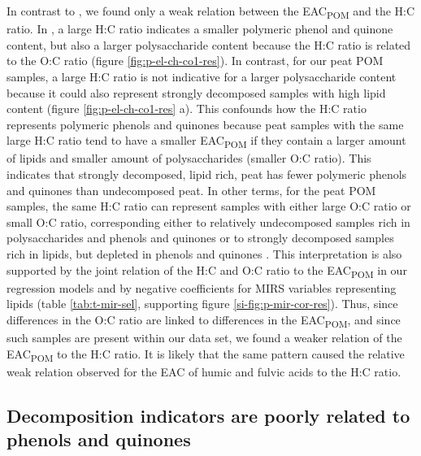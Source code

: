 \documentclass[draft,linenumbers]{agujournal2018}
\begin{document}
In contrast to \citet{Aeschbacher.2012}, we found only a weak relation
between the EAC\textsubscript{POM} and the H:C ratio. In
\citet{Aeschbacher.2012}, a large H:C ratio indicates a smaller
polymeric phenol and quinone content, but also a larger polysaccharide
content because the H:C ratio is related to the O:C ratio (figure
\ref{fig:p-el-ch-co1-res}). In contrast, for our peat POM samples, a
large H:C ratio is not indicative for a larger polysaccharide content
because it could also represent strongly decomposed samples with high
lipid content (figure \ref{fig:p-el-ch-co1-res} a). This confounds how
the H:C ratio represents polymeric phenols and quinones because peat
samples with the same large H:C ratio tend to have a smaller
EAC\textsubscript{POM} if they contain a larger amount of lipids and
smaller amount of polysaccharides (smaller O:C ratio). This indicates
that strongly decomposed, lipid rich, peat has fewer polymeric phenols
and quinones than undecomposed peat. In other terms, for the peat POM
samples, the same H:C ratio can represent samples with either large O:C
ratio or small O:C ratio, corresponding either to relatively
undecomposed samples rich in polysaccharides and phenols and quinones or
to strongly decomposed samples rich in lipids, but depleted in phenols
and quinones \citep{Kim.2003, Leifeld.2012, Bader.2018}. This
interpretation is also supported by the joint relation of the H:C and
O:C ratio to the EAC\textsubscript{POM} in our regression models and by
negative coefficients for MIRS variables representing lipids (table
\ref{tab:t-mir-sel}, supporting figure \ref{si-fig:p-mir-cor-res}).
Thus, since differences in the O:C ratio are linked to differences in
the EAC\textsubscript{POM}, and since such samples are present within
our data set, we found a weaker relation of the EAC\textsubscript{POM}
to the H:C ratio. It is likely that the same pattern caused the relative
weak relation \citet{Tan.2017} observed for the EAC of humic and fulvic
acids to the H:C ratio.

\subsection{Decomposition indicators are poorly related to phenols and
quinones}
\end{document}
